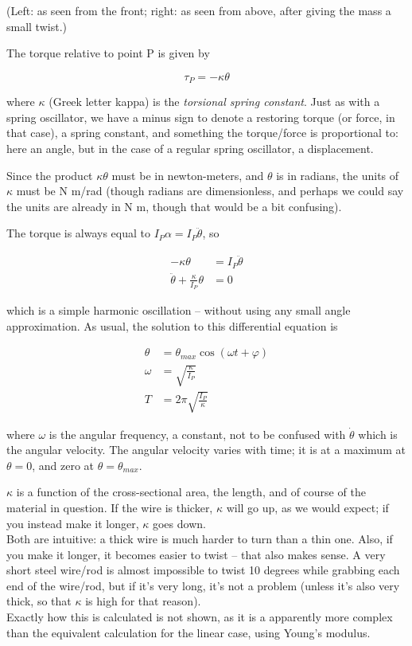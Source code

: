 (Left: as seen from the front; right: as seen from above, after giving the mass a small twist.)

The torque relative to point P is given by

\begin{equation}
\tau_P = -\kappa \theta
\end{equation}

where $\kappa$ (Greek letter kappa) is the \emph{torsional spring constant}. Just as with a spring oscillator, we have a minus sign to denote a restoring torque (or force, in that case), a spring constant, and something the torque/force is proportional to: here an angle, but in the case of a regular spring oscillator, a displacement.

Since the product $\kappa \theta$ must be in newton-meters, and $\theta$ is in radians, the units of $\kappa$ must be N m/rad (though radians are dimensionless, and perhaps we could say the units are already in N m, though that would be a bit confusing).

The torque is always equal to $I_P \alpha = I_P \ddot{\theta}$, so 

\begin{align}
- \kappa \theta &= I_P \ddot{\theta}\\
\ddot{\theta} + \frac{\kappa}{I_P} \theta &= 0
\end{align}

which is a simple harmonic oscillation -- without using any small angle approximation. As usual, the solution to this differential equation is

\begin{align}
\theta    &= \theta_{max} \cos(\omega t + \varphi)\\
\omega &= \sqrt{\frac{\kappa}{I_P}}\\
T          &= 2 \pi \sqrt{\frac{I_P}{\kappa}}
\end{align}

where $\omega$ is the angular frequency, a constant, not to be confused with $\dot{\theta}$ which is the angular velocity. The angular velocity varies with time; it is at a maximum at $\theta = 0$, and zero at $\theta = \theta_{max}$.

$\kappa$ is a function of the cross-sectional area, the length, and of course of the material in question. If the wire is thicker, $\kappa$ will go up, as we would expect; if you instead make it longer, $\kappa$ goes down.\\
Both are intuitive: a thick wire is much harder to turn than a thin one. Also, if you make it longer, it becomes easier to twist -- that also makes sense. A very short steel wire/rod is almost impossible to twist 10 degrees while grabbing each end of the wire/rod, but if it's very long, it's not a problem (unless it's also very thick, so that $\kappa$ is high for that reason).\\
Exactly how this is calculated is not shown, as it is a apparently more complex than the equivalent calculation for the linear case, using Young's modulus.

